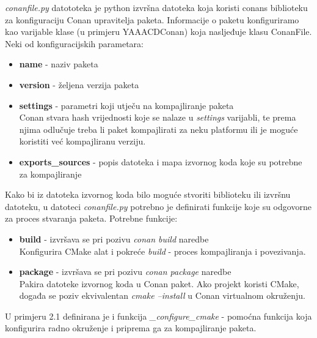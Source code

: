 \textit{conanfile.py} datototeka je python izvršna datoteka koja koristi conans biblioteku za konfiguraciju Conan upravitelja paketa.
Informacije o paketu konfiguriramo kao varijable klase (u primjeru YAAACDConan) koja nasljeđuje klasu ConanFile.\\
Neki od konfiguracijskih parametara:
\begin{itemize}
  \item \textbf{name} - naziv paketa
  \item \textbf{version} - željena verzija paketa
  \item \textbf{settings} - parametri koji utječu na kompajliranje paketa\\
      Conan stvara hash vrijednosti koje se nalaze u \textit{settings} varijabli, te prema njima odlučuje treba li paket kompajlirati
      za neku platformu ili je moguće koristiti već kompajliranu verziju.
  \item \textbf{exports\_sources} - popis datoteka i mapa izvornog koda koje su potrebne za kompajliranje
\end{itemize} 

\pagebreak
Kako bi iz datoteka izvornog koda bilo moguće stvoriti biblioteku ili izvršnu datoteku, u datoteci \textit{conanfile.py} potrebno je definirati
funkcije koje su odgovorne za proces stvaranja paketa.
Potrebne funkcije:
\begin{itemize}
  \item \textbf{build} - izvršava se pri pozivu \textit{conan build} naredbe\\
      Konfigurira CMake alat i pokreće \textit{build} - proces kompajliranja i povezivanja.
  \item \textbf{package} - izvršava se pri pozivu \textit{conan package} naredbe\\
      Pakira datoteke izvornog koda u Conan paket. Ako projekt koristi CMake,
      događa se poziv ekvivalentan \textit{cmake --install} u Conan virtualnom okruženju.
\end{itemize}

U primjeru 2.1 definirana je i funkcija \textit{\_configure\_cmake} - pomoćna funkcija koja konfigurira radno okruženje i priprema ga za
kompajliranje paketa.


